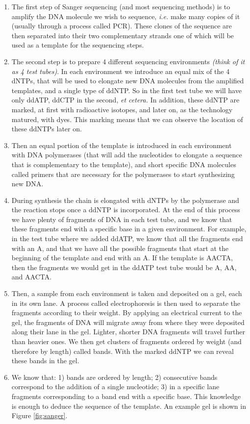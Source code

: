 \documentclass[
  11pt,
  twoside,
  BCOR=10mm,
  listof=totoc]{scrbook}
\providecommand{\tightlist}{%
  \setlength{\itemsep}{0pt}\setlength{\parskip}{0pt}}
\begin{document}
\begin{enumerate}
\def\labelenumi{\arabic{enumi}.}
\tightlist
\item
  The first step of Sanger sequencing (and most sequencing methods) is to amplify the DNA molecule we wish to sequence, \emph{i.e.} make many copies of it (usually through a process called PCR). These clones of the sequence are then separated into their two complementary strands one of which will be used as a template for the sequencing steps.
\item
  The second step is to prepare 4 different sequencing environments \emph{(think of it as 4 test tubes)}. In each environment we introduce an equal mix of the 4 dNTPs, that will be used to elongate new DNA molecules from the amplified templates, and a single type of ddNTP. So in the first test tube we will have only ddATP, ddCTP in the second, \emph{et cetera.} In addition, these ddNTP are marked, at first with radioactive isotopes, and later on, as the technology matured, with dyes. This marking means that we can observe the location of these ddNTPs later on.
\item
  Then an equal portion of the template is introduced in each environment with DNA polymerases (that will add the nucleotides to elongate a sequence that is complementary to the template), and short specific DNA molecules called primers that are necessary for the polymerases to start synthesizing new DNA.
\item
  During synthesis the chain is elongated with dNTPs by the polymerase and the reaction stops once a ddNTP is incorporated. At the end of this process we have plenty of fragments of DNA in each test tube, and we know that these fragments end with a specific base in a given environment. For example, in the test tube where we added ddATP, we know that all the fragments end with an A, and that we have all the possible fragments that start at the beginning of the template and end with an A. If the template is AACTA, then the fragments we would get in the ddATP test tube would be A, AA, and AACTA.
\item
  Then, a sample from each environment is taken and deposited on a gel, each in its own lane. A process called electrophoresis is then used to separate the fragments according to their weight. By applying an electrical current to the gel, the fragments of DNA will migrate away from where they were deposited along their lane in the gel. Lighter, shorter DNA fragments will travel further than heavier ones. We then get clusters of fragments ordered by weight (and therefore by length) called bands. With the marked ddNTP we can reveal these bands in the gel.
\item
  We know that: 1) bands are ordered by length; 2) consecutive bands correspond to the addition of a single nucleotide; 3) in a specific lane fragments corresponding to a band end with a specific base. This knowledge is enough to deduce the sequence of the template. An example gel is shown in Figure \ref{fig:sanger}.
\end{enumerate}
\end{document}
